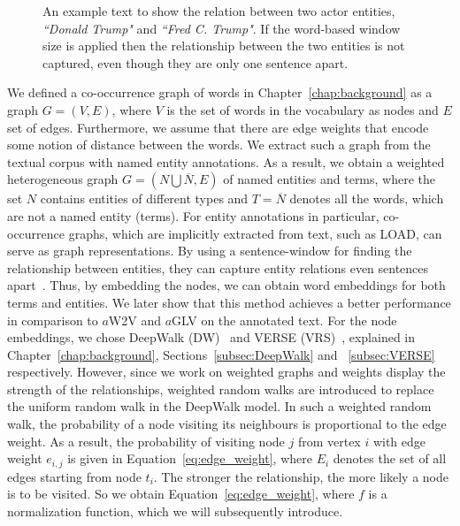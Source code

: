 \begin{figure}
\centering 
\resizebox{0.90\textwidth}{0.2\textwidth}{      

}
\caption{An example text to show the relation between two actor entities, \emph{``Donald Trump"} and \emph{``Fred C. Trump"}. If the word-based window size is applied then the relationship between the two entities is not captured, even though they are only one sentence apart.}
\label{fig:article_entities}
\end{figure}
\noindent
We defined a co-occurrence graph of words in Chapter~\ref{chap:background} as a graph $G=(V,E)$, where $V$ is the set of words in the vocabulary as nodes and $E$ set of edges. Furthermore, we assume that there are edge weights that encode some notion of distance between the words.
We extract such a graph from the textual corpus with named entity annotations. As a result, we obtain a weighted heterogeneous graph $G=(N\bigcup  \overline{N},E)$ of named entities and terms, where the set $N$ contains entities of different types and $ T=\overline{N}$ denotes all the words, which are not a named entity (terms).
For entity annotations in particular, co-occurrence graphs, which are implicitly extracted from text, such as LOAD, can serve as graph representations. By using a sentence-window for finding the relationship between entities, they can capture entity relations even sentences apart~. Thus, by embedding the nodes, we can obtain word embeddings for both terms and entities. We later show that this method achieves a better performance in comparison to $a$W2V and $a$GLV on the annotated text. For the node embeddings, we chose DeepWalk (DW)~ and VERSE (VRS)~, explained in Chapter~\ref{chap:background}, Sections~\ref{subsec:DeepWalk} and ~\ref{subsec:VERSE} respectively.
However, since we work on weighted graphs and weights display the strength of the relationships, weighted random walks are introduced to replace the uniform random walk in the DeepWalk model.
In such a weighted random walk, the probability of a node visiting its neighbours is proportional to the edge weight. As a result, the probability of visiting node $j$ from vertex $i$ with edge weight $e_{i,j}$ is given in Equation~\ref{eq:edge_weight}, where $ E_{ i }$ denotes the set of all edges starting from node $t_{i}$. The stronger the relationship, the more likely a node is to be visited. So we obtain Equation~\ref{eq:edge_weight}, where $f$ is a normalization function, which we will subsequently introduce.

